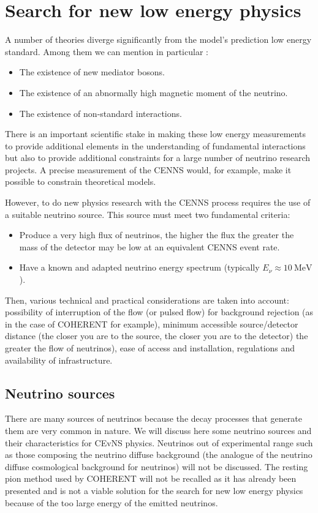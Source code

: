 \section{Search for new low energy physics}

A number of theories diverge significantly from the model's prediction low energy standard. Among them we can mention in particular :
\begin{itemize}
	\item The existence of new  mediator bosons.
	\item The existence of an abnormally high magnetic moment of the neutrino.
	\item The existence of non-standard interactions.
\end{itemize}

There is an important scientific stake in making these low energy measurements to provide additional elements in the understanding of fundamental interactions but also to provide additional constraints for a large number of neutrino research projects. A precise measurement of the CENNS would, for example, make it possible to constrain theoretical models. 

However, to do new physics research with the CENNS process requires the use of a suitable neutrino source. This source must meet two fundamental criteria:
\begin{itemize}
	\item Produce a very high flux of neutrinos, the higher the flux the greater the mass of the detector may be low at an equivalent CENNS event rate.
	\item Have a known and adapted neutrino energy spectrum (typically $E_{\nu} \approx \SI{10}{\mega\eV}$).
\end{itemize}
Then, various technical and practical considerations are taken into account: possibility of interruption of the flow (or pulsed flow) for background rejection (as in the case of COHERENT for example), minimum accessible source/detector distance (the closer you are to the source, the closer you are to the detector) the greater the flow of neutrinos), ease of access and installation, regulations and availability of infrastructure.

\subsection{Neutrino sources}

There are many sources of neutrinos because the decay processes that generate them are very common in nature. We will discuss here some neutrino sources and their characteristics for CEvNS physics. Neutrinos out of experimental range such as those composing the neutrino diffuse background (the analogue of the neutrino diffuse cosmological background for neutrinos) will not be discussed. The resting pion method used by COHERENT will not be recalled as it has already been presented and is not a viable solution for the search for new low energy physics because of the too large energy of the emitted neutrinos.

